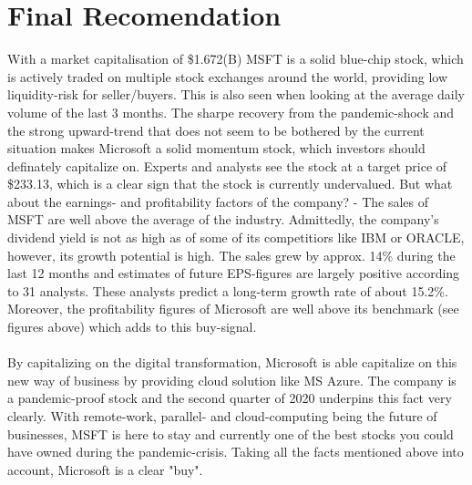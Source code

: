 \documentclass[]{article}
\begin{document}
\section{Final Recomendation}
With a market capitalisation of \$1.672(B) MSFT is a solid blue-chip stock, which is actively traded on multiple stock exchanges around the world, providing low liquidity-risk for seller/buyers. This is also seen when looking at the average daily volume of the last 3 months. The sharpe recovery from the pandemic-shock and the strong upward-trend that does not seem to be bothered by the current situation makes Microsoft a solid momentum stock, which investors should definately capitalize on. Experts and analysts see the stock at a target price of \$233.13, which is a clear sign that the stock is currently undervalued. But what about the earnings- and profitability factors of the company? - The sales of MSFT are well above the average of the industry. Admittedly, the company's dividend yield is not as high as of some of its competitiors like IBM or ORACLE, however, its growth potential is high. The sales grew by approx. 14\% during the last 12 months and estimates of future EPS-figures are largely positive according to 31 analysts. These analysts predict a long-term growth rate of about 15.2\%. Moreover, the profitability figures of Microsoft  are well above its benchmark (see figures above) which adds to this buy-signal.\\\\
By capitalizing on the digital transformation, Microsoft is able capitalize on this new way of business by providing cloud solution like MS Azure. The company is a pandemic-proof stock and the second quarter of 2020 underpins this fact very clearly. With remote-work, parallel- and cloud-computing being the future of businesses, MSFT is here to stay and currently one of the best stocks you could have owned during the pandemic-crisis.
Taking all the facts mentioned above into account, Microsoft is a clear "buy".




\end{document}
